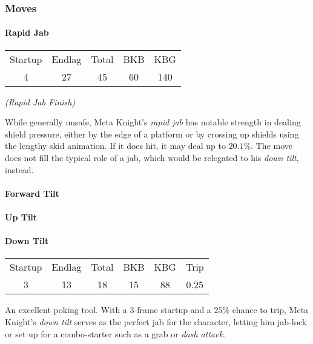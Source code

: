 \subsubsection{Moves} \label{ult-metaknight-moves}

\paragraph[Jab]{Rapid Jab}
\begin{center}
	\begin{tabular}{| c  c  c | c  c |}
		\hline
		Startup	& Endlag & Total & BKB & KBG \\
		4	&	27	&	45	&	60	&	140	\\
		\hline
	\end{tabular}
	
	\emph{(Rapid Jab Finish)}
\end{center}

While generally unsafe, Meta Knight's \emph{rapid jab} has notable strength in dealing shield pressure, either by the edge of a platform or by crossing up shields using the lengthy skid animation. If it does hit, it may deal up to $20.1\%$. The move does not fill the typical role of a jab, which would be relegated to his \textit{down tilt}, instead.

\paragraph{Forward Tilt}

\paragraph{Up Tilt}

\paragraph{Down Tilt}
\begin{center}
	\begin{tabular}{| c  c  c | c  c  c |}
		\hline
		Startup	& Endlag & Total & BKB & KBG & Trip\\
		3	&	13	&	18	&	15	&	88	& 0.25\\
		\hline
	\end{tabular}
\end{center}
An excellent poking tool. With a 3-frame startup and a $25\%$ chance to trip, Meta Knight's \emph{down tilt} serves as the perfect jab for the character, letting him jab-lock or set up for a combo-starter such as a grab or \textit{dash attack}.
%
